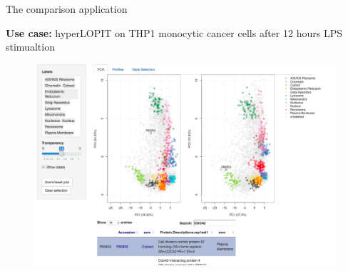 \documentclass[bigger]{beamer}
\begin{document}

\begin{frame}{The comparison application}
\smallskip
  \begin{small} \textbf{Use case:} hyperLOPIT on THP1 monocytic cancer cells after 12 hours LPS stimualtion
  \end{small}
  \begin{figure}
    \includegraphics[width=1\linewidth]{Figures/compare-app.png}
  \end{figure}
\end{frame}
\end{document}

